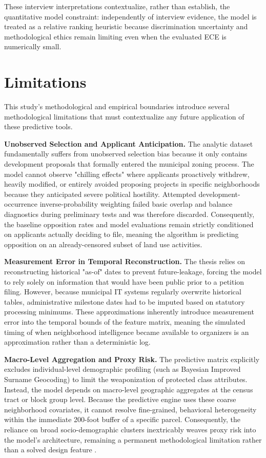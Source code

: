 \documentclass[11pt, letterpaper]{article}
\begin{document}
These interview interpretations contextualize, rather than establish, the quantitative model constraint: independently of interview evidence, the model is treated as a relative ranking heuristic because discrimination uncertainty and methodological ethics remain limiting even when the evaluated ECE is numerically small.

\section{Limitations}
\label{sec:limitations}

This study's methodological and empirical boundaries introduce several methodological limitations that must contextualize any future application of these predictive tools. 

\textbf{Unobserved Selection and Applicant Anticipation.} The analytic dataset fundamentally suffers from unobserved selection bias because it only contains development proposals that formally entered the municipal zoning process. The model cannot observe "chilling effects" where applicants proactively withdrew, heavily modified, or entirely avoided proposing projects in specific neighborhoods because they anticipated severe political hostility. Attempted development-occurrence inverse-probability weighting failed basic overlap and balance diagnostics during preliminary tests and was therefore discarded. Consequently, the baseline opposition rates and model evaluations remain strictly conditioned on applicants actually deciding to file, meaning the algorithm is predicting opposition on an already-censored subset of land use activities.

\textbf{Measurement Error in Temporal Reconstruction.} The thesis relies on reconstructing historical "as-of" dates to prevent future-leakage, forcing the model to rely solely on information that would have been public prior to a petition filing. However, because municipal IT systems regularly overwrite historical tables, administrative milestone dates had to be imputed based on statutory processing minimums. These approximations inherently introduce measurement error into the temporal bounds of the feature matrix, meaning the simulated timing of when neighborhood intelligence became available to organizers is an approximation rather than a deterministic log.

\textbf{Macro-Level Aggregation and Proxy Risk.} The predictive matrix explicitly excludes individual-level demographic profiling (such as Bayesian Improved Surname Geocoding) to limit the weaponization of protected class attributes. Instead, the model depends on macro-level geographic aggregates at the census tract or block group level. Because the predictive engine uses these coarse neighborhood covariates, it cannot resolve fine-grained, behavioral heterogeneity within the immediate 200-foot buffer of a specific parcel. Consequently, the reliance on broad socio-demographic clusters inextricably weaves proxy risk into the model's architecture, remaining a permanent methodological limitation rather than a solved design feature \cite{barocas2016,benjamin2019race,obermeyer2019racial}. 
\end{document}
